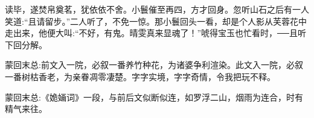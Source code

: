 \begin{parag}
    读毕，遂焚帛奠茗，犹依依不舍。小鬟催至再四，方才回身。忽听山石之后有一人笑道:“且请留步。”二人听了，不免一惊。那小鬟回头一看，却是个人影从芙蓉花中走出来，他便大叫:“不好，有鬼。晴雯真来显魂了！”唬得宝玉也忙看时，──且听下回分解。
\end{parag}


\begin{parag}
    \begin{note}蒙回末总:前文入一院，必叙一番养竹种花，为诸婆争利渲染。此文入一院，必叙一番树枯香老，为亲眷凋零凄楚。字字实境，字字奇情，令我把玩不释。\end{note}
\end{parag}


\begin{parag}
    \begin{note}蒙回末总:《姽婳词》一段，与前后文似断似连，如罗浮二山，烟雨为连合，时有精气来往。\end{note}
\end{parag}
